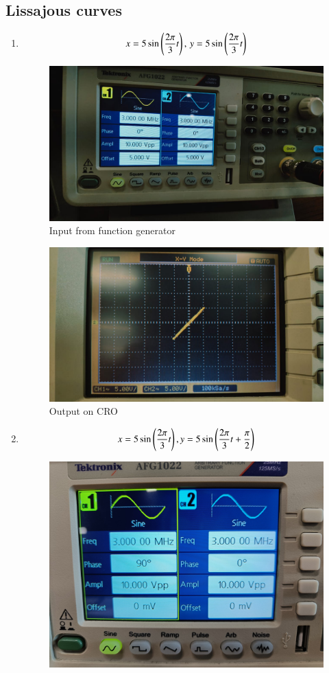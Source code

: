 \documentclass[journal]{IEEEtran}
\begin{document}
\subsection{Lissajous curves}
\begin{enumerate}
    \item \begin{align*}
        x = 5\sin\left(\frac{2\pi}{3}t\right),\,y = 5\sin\left(\frac{2\pi}{3}t\right)
    \end{align*}
    \begin{figure}[h]
        \centering
        \includegraphics[width=0.7\columnwidth]{pics/WhatsApp Image 2025-01-15 at 23.32.36.jpeg}
        \caption{Input from function generator}
    \end{figure}
    \begin{figure}[h]
        \centering
        \includegraphics[width=0.7\columnwidth]{pics/WhatsApp Image 2025-01-15 at 23.32.36(1).jpeg}
        \caption{Output on CRO}
    \end{figure}
    \item \begin{align*}
        x = 5\sin\left(\frac{2\pi}{3}t\right), y = 5\sin\left(\frac{2\pi}{3}t+\frac{\pi}{2}\right)
    \end{align*}
    \begin{figure}[H]
        \centering
        \includegraphics[width=0.7\columnwidth]{pics/WhatsApp Image 2025-01-23 at 13.22.01(1).jpeg}

\end{figure}
\end{enumerate}
\end{document}
